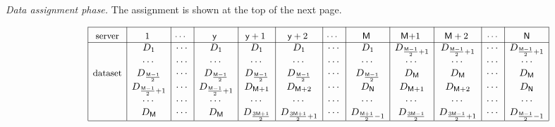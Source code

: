\documentclass[conference,letterpaper]{IEEEtran}
\begin{document}
{\it Data assignment phase.}
The assignment is shown at the top of the next page.
\begin{figure}
\begin{align*}
\begin{array}{rl|c|c|c|c|c|c|c|c|c|c|c|c|}\cline{3-3}\cline{4-4}\cline{5-5}\cline{6-6}\cline{7-7}\cline{8-8}\cline{9-9}\cline{10-10}\cline{11-11}\cline{12-12}\cline{13-13}\cline{14-14}
&&\rule{0pt}{1.2em}\mbox{\small server} &\rule{0pt}{1.2em}\mbox{\small \negmedspace\negmedspace 1 \negmedspace\negmedspace} & \mbox{\small \negmedspace\negmedspace $\cdots$ \negmedspace\negmedspace} &  \rule{0pt}{1.2em}\mbox{\small \negmedspace\negmedspace $\ysf$ \negmedspace\negmedspace}& \rule{0pt}{1.2em}\mbox{\small \negmedspace\negmedspace  $\ysf +1$ \negmedspace\negmedspace}&  \rule{0pt}{1.2em}\mbox{\small \negmedspace\negmedspace  $\ysf+2$ \negmedspace\negmedspace}&  \rule{0pt}{1.2em}\mbox{\small \negmedspace\negmedspace $\cdots$ \negmedspace\negmedspace} &  \rule{0pt}{1.2em}\mbox{\small \negmedspace\negmedspace $\Msf$ \negmedspace\negmedspace} &\rule{0pt}{1.2em}\mbox{\small \negmedspace\negmedspace  $\Msf$+1 \negmedspace\negmedspace} & \rule{0pt}{1.2em}\mbox{\small \negmedspace\negmedspace  $\Msf+2$ \negmedspace\negmedspace} & \rule{0pt}{1.2em}\mbox{\small \negmedspace\negmedspace $\cdots$\negmedspace\negmedspace }& \rule{0pt}{1.2em}\mbox{\small \negmedspace\negmedspace $\Nsf$\negmedspace\negmedspace} \\ 
\cline{3-3}\cline{4-4}\cline{5-5}\cline{6-6}\cline{7-7}\cline{8-8}\cline{9-9}\cline{10-10}\cline{11-11}\cline{12-12}\cline{13-13}\cline{14-14}
&& &D_1& \cdots       &   D_1 &  D_{1} &  D_{1} & \cdots &  D_{1}   &  D_{\frac{\Msf-1}{2}+1}   &  D_{\frac{\Msf-1}{2}+1} &  \cdots  &  D_{\frac{\Msf-1}{2}+1}  \\
&& &\cdots & \cdots & \cdots &  \cdots & \cdots  & \cdots   & \cdots  & \cdots & \cdots & \cdots & \cdots  \\ 
&& \mbox{\small dataset}&D_{\frac{\Msf-1}{2}} &    \cdots    & D_{\frac{\Msf-1}{2}}  & D_{\frac{\Msf-1}{2}} & D_{\frac{\Msf-1}{2}}    & \cdots  & D_{\frac{\Msf-1}{2}} &   D_{\Msf}  &   D_{\Msf}  &  \cdots  &  D_{\Msf}  \\
&& &D_{\frac{\Msf-1}{2}+1}&  \cdots  & D_{\frac{\Msf-1}{2}+1}  & D_{\Msf+1} & D_{\Msf+2} & \cdots & D_{\Nsf}& D_{\Msf+1}  &  D_{\Msf+2} &   \cdots  &  D_{\Nsf} \\ 
&& &\cdots &  \cdots       & \cdots & \cdots & \cdots   & \cdots & \cdots & \cdots & \cdots   & \cdots & \cdots \\
&& &D_{\Msf} &   \cdots  &  D_{\Msf} & D_{\frac{3\Msf+1}{2}} & D_{\frac{3\Msf+1}{2} +1}  & \cdots & D_{\frac{\Msf+1}{2}-1} &  D_{\frac{3\Msf-1}{2}}  &  D_{\frac{3\Msf-1}{2}+1}   &  \cdots  &  D_{\frac{\Msf-1}{2}-1}\\  
\cline{3-3}\cline{4-4}\cline{5-5}\cline{6-6}\cline{7-7}\cline{8-8}\cline{9-9}\cline{10-10}\cline{11-11}\cline{12-12}\cline{13-13}\cline{14-14}
\end{array} 
\end{align*}
\end{figure}
\end{document}
